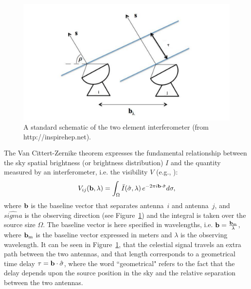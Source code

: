 \begin{figure}[]
\begin{center}
\includegraphics[width=1.\textwidth]{Bernardi/2_element_interferometer}
\end{center}
\caption{A standard schematic of the two element interferometer (from http://inspirehep.net).}
\label{fig:fig1}
\end{figure}

The Van Cittert-Zernike theorem expresses the fundamental relationship between the sky spatial brightness (or brightness distribution) $I$ and the quantity measured by an interferometer, i.e. the visibility $V$ (e.g., \cite{TMS}):
\begin{equation}
V_{ij} ({\bf b}, \lambda) = \int_\Omega {\bar I} (\hat{\sigma}, \lambda) \, e^{-2 \pi i {\bf b} \cdot {\hat \sigma}} d {\bf \sigma},
\label{eq:1}
\end{equation}
where ${\bf b}$ is the baseline vector that separates antenna~$i$ and antenna~$j$, and $\hat{sigma}$ is the observing direction (see Figure~\ref{fig:fig1}) and the integral is taken over the source size $\Omega$. The baseline vector is here specified in wavelengths, i.e. ${\bf b} = \frac{{\bf b_{\rm m}}}{\lambda}$, where ${\bf b_{\rm m}}$ is the baseline vector expressed in meters and $\lambda$ is the observing wavelength. It can be seen in Figure~\ref{fig:fig1}, that the celestial signal travels an extra path between the two antennas, and that length corresponds to a geometrical time delay $\tau = {\bf b} \cdot {\hat \sigma}$, where the word ``geometrical" refers to the fact that the delay depends upon the source position in the sky and the relative separation between the two antennas.


